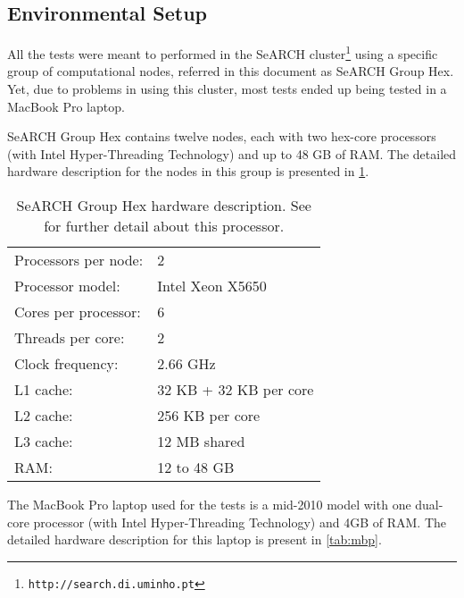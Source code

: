 \subsection{Environmental Setup}
\label{sec:environment}
All the tests were meant to performed in the SeARCH cluster\footnote{\texttt{http://search.di.uminho.pt}} using a specific group of computational nodes, referred in this document as SeARCH Group Hex. Yet, due to problems in using this cluster, most tests ended up being tested in a MacBook Pro laptop.

SeARCH Group Hex contains twelve nodes, each with two hex-core processors (with Intel{\textsuperscript{\textregistered}} Hyper-Threading Technology) and up to 48 GB of RAM. The detailed hardware description for the nodes in this group is presented in \cref{tab:grouphex}.

\begin{table}[!htp]
	\begin{center}
		\begin{tabular}{ll}
			\hline
			Processors per node: & 2	\\
			Processor model: & Intel{\textsuperscript{\textregistered}} Xeon{\textsuperscript{\textregistered}} X5650\\
			Cores per processor: & 6	\\
			Threads per core: & 2	\\
			Clock frequency: & 2.66 GHz	\\
			\hline
			L1 cache: & 32 KB + 32 KB per core	\\
			L2 cache: & 256 KB per core	\\
			L3 cache: & 12 MB shared	\\
			RAM: & 12 to 48 GB	\\
			\hline
		\end{tabular}
		\caption[SeARCH Group Hex hardware description]{SeARCH Group Hex hardware description. See \cite{xeon5600} for further detail about this processor.}
		\label{tab:grouphex}
	\end{center}
\end{table}

The MacBook Pro laptop used for the tests is a mid-2010 model with one dual-core processor (with Intel{\textsuperscript{\textregistered}} Hyper-Threading Technology) and 4GB of RAM. The detailed hardware description for this laptop is present in \cref{tab:mbp}.

